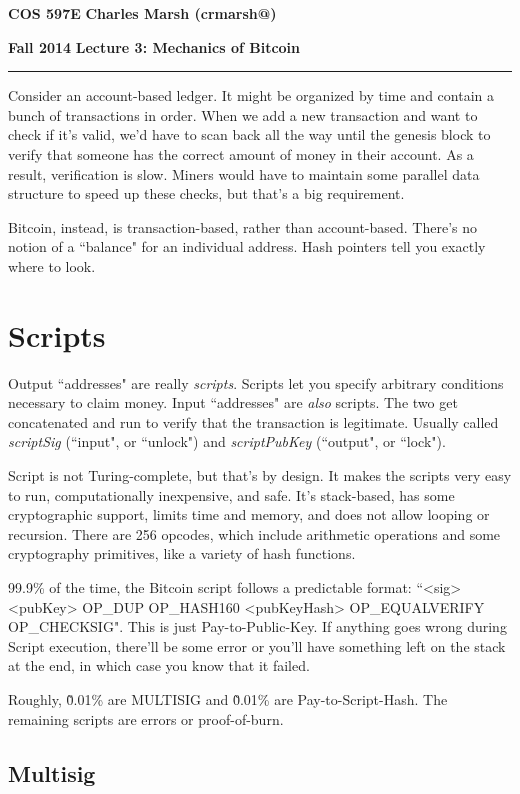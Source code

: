 \documentclass[12pt]{article}
\makeatletter
\newcommand{\myheader}[4]
{\vspace*{-0.5in}
\noindent
{#1} \hfill {#3}

\noindent
{#2} \hfill {#4}

\noindent
\rule[8pt]{\textwidth}{1pt}

\vspace{1ex} 
}  %
\newcommand{\myalgsheader}[0]
{\myheader
{ {\bf{COS 597E}} }
{ {\bf{Fall 2014}} }
{ {\bf{Charles Marsh (crmarsh@)}} }
{ {\bf{Lecture 3: Mechanics of Bitcoin}} }
}
\makeatother
\begin{document}
\myalgsheader

\pagestyle{plain}

Consider an account-based ledger. It might be organized by time and contain a bunch of transactions in order. When we add a new transaction and want to check if it's valid, we'd have to scan back all the way until the genesis block to verify that someone has the correct amount of money in their account. As a result, verification is slow. Miners would have to maintain some parallel data structure to speed up these checks, but that's a big requirement.

Bitcoin, instead, is transaction-based, rather than account-based. There's no notion of a ``balance" for an individual address. Hash pointers tell you exactly where to look.

\section*{Scripts}

Output ``addresses" are really \textit{scripts}. Scripts let you specify arbitrary conditions necessary to claim money. Input ``addresses" are \textit{also} scripts. The two get concatenated and run to verify that the transaction is legitimate. Usually called \textit{scriptSig} (``input", or ``unlock") and \textit{scriptPubKey} (``output", or ``lock").

Script is not Turing-complete, but that's by design. It makes the scripts very easy to run, computationally inexpensive, and safe. It's stack-based, has some cryptographic support, limits time and memory, and does not allow looping or recursion. There are 256 opcodes, which include arithmetic operations and some cryptography primitives, like a variety of hash functions.

99.9\% of the time, the Bitcoin script follows a predictable format: ``<sig> <pubKey> OP\_DUP OP\_HASH160 <pubKeyHash> OP\_EQUALVERIFY OP\_CHECKSIG". This is just Pay-to-Public-Key. If anything goes wrong during Script execution, there'll be some error or you'll have something left on the stack at the end, in which case you know that it failed.

Roughly, \~0.01\% are MULTISIG and \~0.01\% are Pay-to-Script-Hash. The remaining scripts are errors or proof-of-burn.

\subsection*{Multisig}
\end{document}
